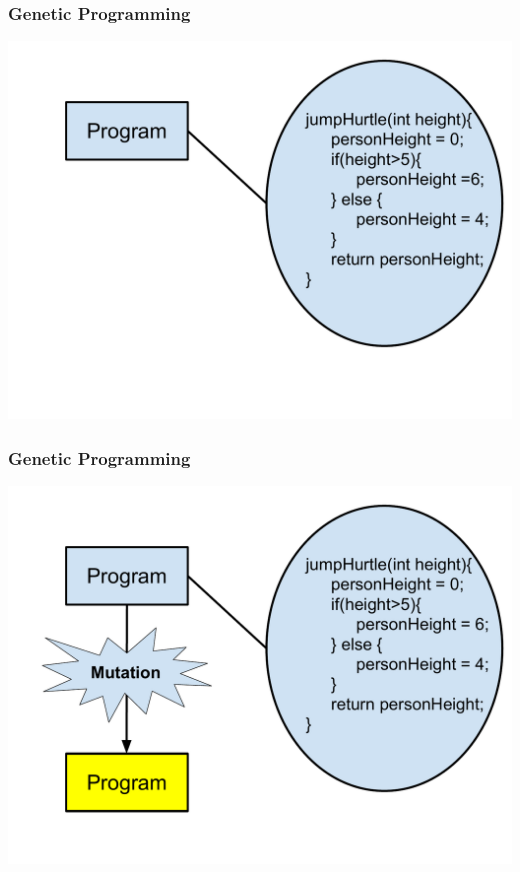 \documentclass{beamer}
\begin{document}
\begin{frame}
	\frametitle{Genetic Programming}
	\includegraphics[height=.9\textheight]{Illustrations/gp_3.PDF}
\end{frame}
\begin{frame}
	\frametitle{Genetic Programming}
	\includegraphics[height=.9\textheight]{Illustrations/gp_4.PDF}
\end{frame}
\end{document}
